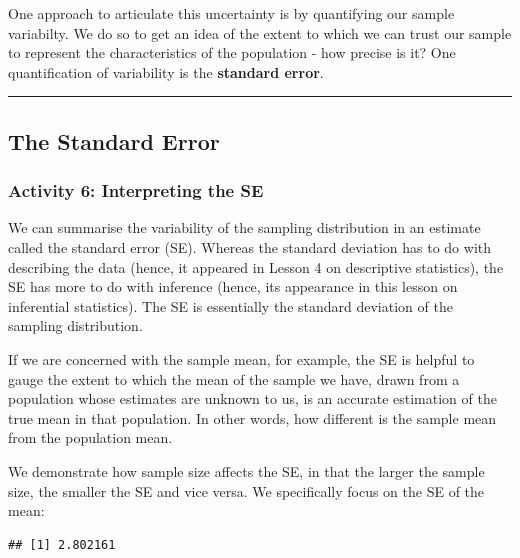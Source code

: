 \documentclass[
]{book}
\newenvironment{Shaded}{\begin{snugshade}}{\end{snugshade}}
\newcommand{\FunctionTok}[1]{\textcolor[rgb]{0.00,0.00,0.00}{#1}}
\newcommand{\NormalTok}[1]{#1}
\newcommand{\SpecialCharTok}[1]{\textcolor[rgb]{0.00,0.00,0.00}{#1}}
\begin{document}
One approach to articulate this uncertainty is by quantifying our sample variabilty. We do so to get an idea of the extent to which we can trust our sample to represent the characteristics of the population - how precise is it? One quantification of variability is the \textbf{standard error}.

\begin{center}\rule{0.5\linewidth}{0.5pt}\end{center}

\hypertarget{the-standard-error}{%
\subsection{The Standard Error}\label{the-standard-error}}

\hypertarget{activity-6-interpreting-the-se}{%
\subsubsection{Activity 6: Interpreting the SE}\label{activity-6-interpreting-the-se}}

We can summarise the variability of the sampling distribution in an estimate called the standard error (SE). Whereas the standard deviation has to do with describing the data (hence, it appeared in Lesson 4 on descriptive statistics), the SE has more to do with inference (hence, its appearance in this lesson on inferential statistics). The SE is essentially the standard deviation of the sampling distribution.

If we are concerned with the sample mean, for example, the SE is helpful to gauge the extent to which the mean of the sample we have, drawn from a population whose estimates are unknown to us, is an accurate estimation of the true mean in that population. In other words, how different is the sample mean from the population mean.

We demonstrate how sample size affects the SE, in that the larger the sample size, the smaller the SE and vice versa. We specifically focus on the SE of the mean:

\begin{Shaded}
\end{Shaded}

\begin{verbatim}
## [1] 2.802161
\end{verbatim}
\end{document}
